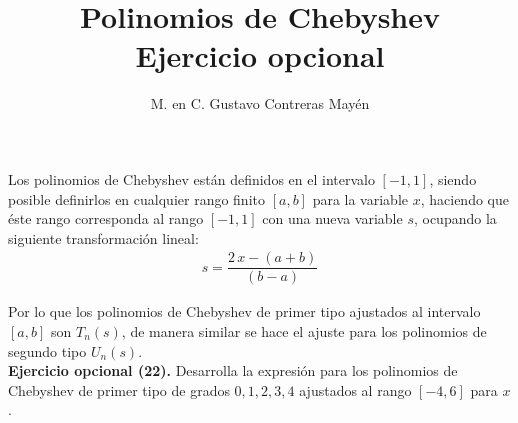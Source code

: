 
\title{Polinomios de Chebyshev \\[0.3em]  \large{Ejercicio opcional} \vspace{-3ex}}
\author{M. en C. Gustavo Contreras Mayén}
\date{ }


\vspace{-4cm}
\maketitle
\fontsize{14}{14}\selectfont


Los polinomios de Chebyshev están definidos en el intervalo $[- 1, 1]$, siendo posible definirlos en cualquier rango finito $[a, b]$ para la variable $x$, haciendo que éste rango corresponda al rango $[-1, 1]$ con una nueva variable $s$, ocupando la siguiente transformación lineal:
\begin{align*}
s = \dfrac{2 \, x - (a + b)}{(b - a)}
\end{align*}

Por lo que los polinomios de Chebyshev de primer tipo ajustados al intervalo $[a, b]$ son $T_{n}(s)$, de manera similar se hace el ajuste para los polinomios de segundo tipo  $U_{n} (s)$.
\\[0.5em]
\noindent
\textbf{Ejercicio opcional (22).} Desarrolla la expresión para los polinomios de Chebyshev de primer tipo de grados $0, 1, 2, 3, 4$ ajustados al rango $[-4, 6]$ para $x$.



